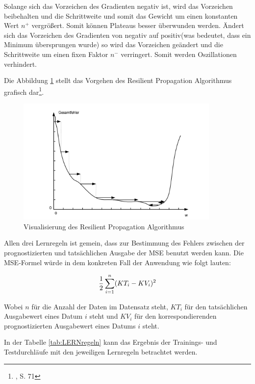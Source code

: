 \begin{itemize}
Solange sich das Vorzeichen des Gradienten negativ ist, wird das Vorzeichen beibehalten und die Schrittweite und somit das Gewicht um einen konstanten Wert $n^{+}$ vergrößert. Somit können Plateaus besser überwunden werden.
Ändert sich das Vorzeichen des Gradienten von negativ auf positiv(was bedeutet, dass ein Minimum übersprungen wurde) so wird das Vorzeichen geändert und die Schrittweite um  einen fixen Faktor $n^{-}$ verringert. Somit werden Oszillationen verhindert.

Die Abbildung \ref{fig:RP} stellt das Vorgehen des Resilient Propagation Algorithmus grafisch dar\footnote{\Vgl{}, S. 71}.

\begin{figure}[H]
	\centering
	\includegraphics[width=10cm]{VisuResi.PNG}
	\caption{Visualisierung des Resilient Propagation Algorithmus}
	\label{fig:RP}
\end{figure}

\end{itemize}

Allen drei Lernregeln ist gemein, dass zur Bestimmung des Fehlers zwischen der prognostizierten und tatsächlichen Ausgabe der MSE benutzt werden kann. Die MSE-Formel würde in dem konkreten Fall der Anwendung wie folgt lauten:

\begin{equation}\formelentry{MSE zur Berechnung der Abweichung}
   \frac{1}{2}\sum^{n}_{i=1} (KT_{i} - KV_{i})^2
\end{equation}

Wobei $n$ für die Anzahl der Daten im Datensatz steht, $KT_i$ für den tatsächlichen Ausgabewert eines Datum $i$ steht und $KV_i$ für den korrespondierenden prognostizierten Ausgabewert eines Datums $i$ steht.

In der Tabelle \ref{tab:LERNregeln} kann das Ergebnis der Trainings- und Testdurchläufe mit den jeweiligen Lernregeln betrachtet werden.

